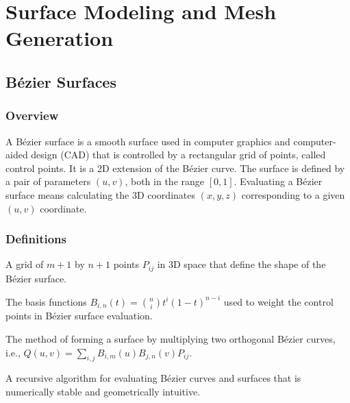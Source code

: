 \chapter{Surface Modeling and Mesh Generation}
\label{ch:surface_modeling}

\section{B\'ezier Surfaces}
\label{sec:bezier_surface}

\subsection{Overview}
A B\'ezier surface is a smooth surface used in computer graphics and computer-aided design (CAD) that is controlled by a rectangular grid of points, called control points\cite{bezier1968,farin2002}. It is a 2D extension of the B\'ezier curve. The surface is defined by a pair of parameters $(u, v)$, both in the range $[0, 1]$. Evaluating a B\'ezier surface means calculating the 3D coordinates $(x, y, z)$ corresponding to a given $(u, v)$ coordinate.

\subsection{Definitions}
\begin{definition}\label{def:control_points}
A grid of $m+1$ by $n+1$ points $P_{ij}$ in 3D space that define the shape of the B\'ezier surface.
\end{definition}

\begin{definition}\label{def:bernstein_polynomials}
The basis functions $B_{i,n}(t) = \binom{n}{i} t^i (1-t)^{n-i}$ used to weight the control points in B\'ezier surface evaluation.
\end{definition}

\begin{definition}\label{def:tensor_product}
The method of forming a surface by multiplying two orthogonal B\'ezier curves, i.e., $Q(u,v) = \sum_{i,j} B_{i,m}(u) B_{j,n}(v) P_{ij}$.
\end{definition}

\begin{definition}\label{def:de_casteljau}
A recursive algorithm for evaluating B\'ezier curves and surfaces that is numerically stable and geometrically intuitive.
\end{definition}

